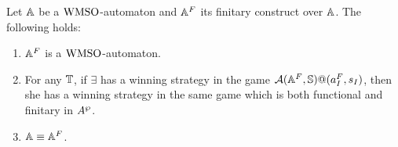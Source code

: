 
\begin{lemma}\label{PROP_facts_finConstr} Let $\mathbb{A}$ be a $\mathrm{WMSO}$-automaton and $\mathbb{A}^{F}$ its finitary construct over $\mathbb{A}$. The following holds:
\begin{enumerate}
   pt
  \item $\mathbb{A}^{F}$ is a $\mathrm{WMSO}$-automaton. \label{point:finConstrAut}
  \item For any $\mathbb{T}$, if $\exists$ has a winning strategy in
  the game $\mathcal{A}(\mathbb{A}^{F},\mathbb{S})@(a_I^{F},s_I)$, then she has a winning strategy in the same game which is both functional and finitary in $A^{\wp}$. \label{point:finConstrStrategy}
  \item $\mathbb{A} \equiv \mathbb{A}^{F}$. \label{point:finConstrEquiv}
  \end{enumerate}
\end{lemma}
